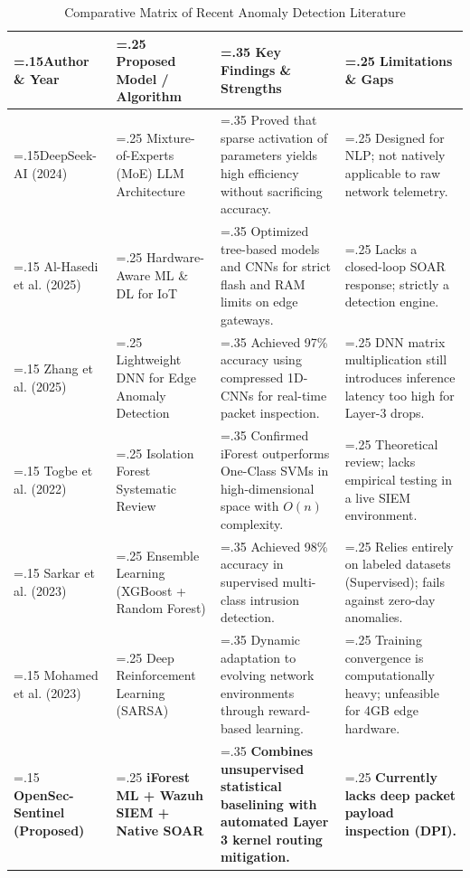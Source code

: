 \documentclass[12pt, a4paper]{report}
\begin{document}
	\begin{table}[H]
		\centering
		\caption{Comparative Matrix of Recent Anomaly Detection Literature}
		\vspace{0.2cm}
		\begin{tabularx}{\textwidth}{|>{\hsize=.15\hsize}X|>{\hsize=.25\hsize}X|>{\hsize=.35\hsize}X|>{\hsize=.25\hsize}X|}
			\hline
			\textbf{Author \& Year} & \textbf{Proposed Model / Algorithm} & \textbf{Key Findings \& Strengths} & \textbf{Limitations \& Gaps} \\
			\hline
			DeepSeek-AI (2024) & Mixture-of-Experts (MoE) LLM Architecture & Proved that sparse activation of parameters yields high efficiency without sacrificing accuracy. & Designed for NLP; not natively applicable to raw network telemetry. \\
			\hline
			Al-Hasedi et al. (2025) & Hardware-Aware ML \& DL for IoT & Optimized tree-based models and CNNs for strict flash and RAM limits on edge gateways. & Lacks a closed-loop SOAR response; strictly a detection engine. \\
			\hline
			Zhang et al. (2025) & Lightweight DNN for Edge Anomaly Detection & Achieved 97\% accuracy using compressed 1D-CNNs for real-time packet inspection. & DNN matrix multiplication still introduces inference latency too high for Layer-3 drops. \\
			\hline
			Togbe et al. (2022) & Isolation Forest Systematic Review & Confirmed iForest outperforms One-Class SVMs in high-dimensional space with $O(n)$ complexity. & Theoretical review; lacks empirical testing in a live SIEM environment. \\
			\hline
			Sarkar et al. (2023) & Ensemble Learning (XGBoost + Random Forest) & Achieved 98\% accuracy in supervised multi-class intrusion detection. & Relies entirely on labeled datasets (Supervised); fails against zero-day anomalies. \\
			\hline
			Mohamed et al. (2023) & Deep Reinforcement Learning (SARSA) & Dynamic adaptation to evolving network environments through reward-based learning. & Training convergence is computationally heavy; unfeasible for 4GB edge hardware. \\
			\hline
			\textbf{OpenSec-Sentinel (Proposed)} & \textbf{iForest ML + Wazuh SIEM + Native SOAR} & \textbf{Combines unsupervised statistical baselining with automated Layer 3 kernel routing mitigation.} & \textbf{Currently lacks deep packet payload inspection (DPI).} \\
			\hline
		\end{tabularx}
	\end{table}
	
\end{document}
